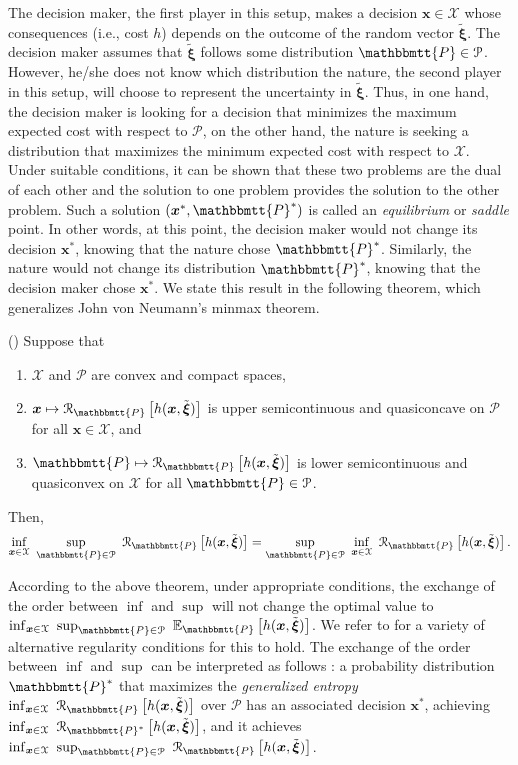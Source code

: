 \documentclass[final,onefignum,onetabnum]{class}
\newcommand{\ee}[2]{\mathbb{E}_{#1} \left[ #2 \right]}
\newcommand{\rrisk}[2]{\Cs{R}_{#1} \left[ #2 \right]}
\newcommand{\bs}[1]{\boldsymbol{#1}} %
\newcommand{\Ts}[1]{\mathbbmtt{#1}} %
\newcommand{\Cs}[1]{\mathcal{#1}} %
\newcommand{\txi}{\tilde{\bs{\xi}}}
\begin{document}
The decision maker, the first player in this setup, makes a decision $\bs{x} \in \Cs{X}$ whose consequences (i.e., cost $h$) depends on the outcome of the random vector $\txi$. The decision maker assumes  that $\txi$ follows some distribution $\Ts{P} \in \Cs{P}$. However, he/she does not know which   distribution the nature, the second player in this setup, will choose to represent the uncertainty in $\txi$. Thus, in one hand, the decision maker is looking for a decision that minimizes the maximum expected cost with respect to $\Cs{P}$, on the other hand, the nature is seeking a distribution that maximizes the minimum expected cost with respect to $\Cs{X}$.  Under suitable conditions, it can be shown that these two problems are the dual of each other and the solution to one problem provides the solution to the other problem. Such a solution $(\bs{x}^{*}, \Ts{P}^{*})$ is called an {\it equilibrium} or {\it saddle} point. In other words, at this point,  the decision maker would not change its decision $\bs{x}^{*}$, knowing that the nature chose $\Ts{P}^{*}$. Similarly, the nature would not change its distribution $\Ts{P}^{*}$, knowing that the decision maker chose $\bs{x}^{*}$. We state this result in the following theorem, which generalizes John von Neumann's minmax theorem. 

\begin{theorem}{(\citet[Theorem~3.4]{sion1958})}
    Suppose that 
    \begin{enumerate}[label=(\roman*)]
        \item $\Cs{X}$ and $\Cs{P}$ are convex and compact spaces,
        \item $\bs{x} \mapsto \rrisk{\Ts{P}}{h(\bs{x},\txi)}$ is upper semicontinuous and quasiconcave on $\Cs{P}$ for all $\bs{x} \in \Cs{X}$, and 
        \item $\Ts{P} \mapsto \rrisk{\Ts{P}}{h(\bs{x},\txi)}$ is lower semicontinuous and quasiconvex on $\Cs{X}$ for all $\Ts{P} \in \Cs{P}$. 
    \end{enumerate}
        Then, 
        $$ \inf_{\bs{x} \in \Cs{X} } \ \sup_{\Ts{P} \in \Cs{P}} \ 	\rrisk{\Ts{P}}{h(\bs{x},\txi)}= \sup_{\Ts{P} \in \Cs{P}} \  \inf_{\bs{x} \in \Cs{X} } \	\rrisk{\Ts{P}}{h(\bs{x},\txi)}.$$
\end{theorem}

According to the above theorem, under appropriate conditions, the exchange of the order between $\inf$ and $\sup$ will not change the optimal value to \linebreak $\inf_{\bs{x} \in \Cs{X} } \ \sup_{\Ts{P} \in \Cs{P}} \ 	\ee{\Ts{P}}{h(\bs{x},\txi)}$. We refer to \citet{grunwald2004game} for a variety of alternative regularity conditions for this to hold. The exchange of the order between $\inf$ and $\sup$ can be interpreted as follows \cite{grunwald2004game}: a probability distribution $\Ts{P}^{*}$ that maximizes the {\it generalized entropy} $\inf_{\bs{x} \in \Cs{X}} \ \rrisk{\Ts{P}}{h(\bs{x},\txi)}$ over $\Cs{P}$  has an associated decision $\bs{x}^{*}$, achieving  $\inf_{\bs{x} \in \Cs{X}} \ \rrisk{\Ts{P}^{*}}{h(\bs{x},\txi)}$,  and it achieves $\inf_{\bs{x} \in \Cs{X}} \ \sup_{\Ts{P} \in \Cs{P}} \ \rrisk{\Ts{P}}{h(\bs{x},\txi)}$. 
\end{document}
